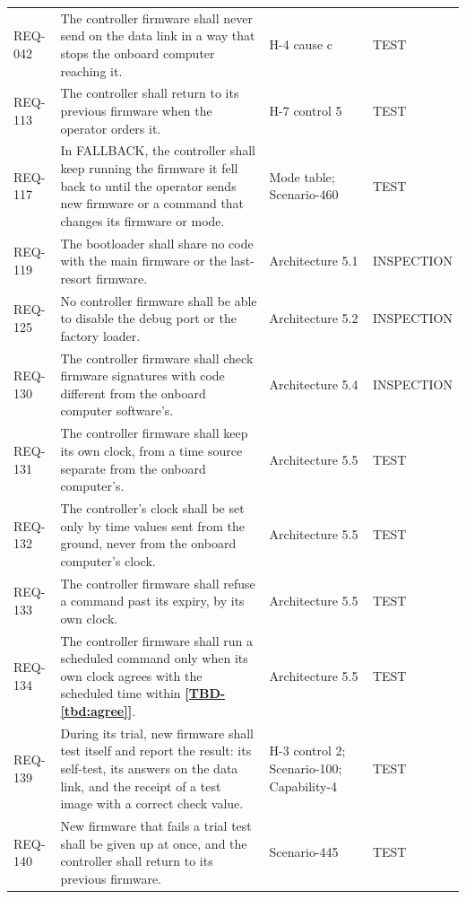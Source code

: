 \documentclass[11pt,a4paper]{article}
\newcommand{\tbd}[1]{\mbox{\textbf{[\hyperref[tbd:#1]{TBD-\ref*{tbd:#1}}]}}}
\begin{document}
{\begin{xltabular}{\textwidth}{@{}l>{\raggedright\arraybackslash}X>{\raggedright\arraybackslash}p{3.2cm}>{\raggedright\arraybackslash}p{3.0cm}@{}}
REQ-042 & The controller firmware shall never send on the data link in a way that stops the onboard computer reaching it. & H-4 cause c & TEST \\
REQ-113 & The controller shall return to its previous firmware when the operator orders it. & H-7 control 5 & TEST \\
REQ-117 & In FALLBACK, the controller shall keep running the firmware it fell back to until the operator sends new firmware or a command that changes its firmware or mode. & Mode table; Scenario-460 & TEST \\
REQ-119 & The bootloader shall share no code with the main firmware or the last-resort firmware. & Architecture 5.1 & INSPECTION \\
REQ-125 & No controller firmware shall be able to disable the debug port or the factory loader. & Architecture 5.2 & INSPECTION \\
REQ-130 & The controller firmware shall check firmware signatures with code different from the onboard computer software's. & Architecture 5.4 & INSPECTION \\
REQ-131 & The controller firmware shall keep its own clock, from a time source separate from the onboard computer's. & Architecture 5.5 & TEST \\
REQ-132 & The controller's clock shall be set only by time values sent from the ground, never from the onboard computer's clock. & Architecture 5.5 & TEST \\
REQ-133 & The controller firmware shall refuse a command past its expiry, by its own clock. & Architecture 5.5 & TEST \\
REQ-134 & The controller firmware shall run a scheduled command only when its own clock agrees with the scheduled time within \tbd{agree}. & Architecture 5.5 & TEST \\
REQ-139 & During its trial, new firmware shall test itself and report the result: its self-test, its answers on the data link, and the receipt of a test image with a correct check value. & H-3 control 2; Scenario-100; Capability-4 & TEST \\
REQ-140 & New firmware that fails a trial test shall be given up at once, and the controller shall return to its previous firmware. & Scenario-445 & TEST \\
\bottomrule
\end{xltabular}}

\end{document}
